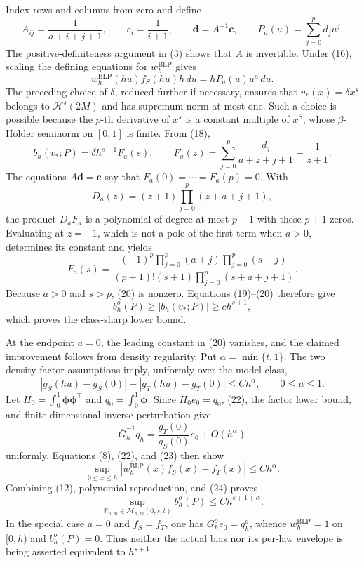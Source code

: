 Index rows and columns from zero and define
\[
A_{ij}=\frac1{a+i+j+1},
\qquad c_i=\frac1{i+1},
\qquad \boldsymbol d=A^{-1}\boldsymbol c,
\qquad P_a(u)=\sum_{j=0}^pd_ju^j.
\tag{17}
\]
The positive-definiteness argument in (3) shows that \(A\) is invertible. Under (16), scaling the defining equations for \(w_h^{\mathrm{BLP}}\) gives
\[
w_h^{\mathrm{BLP}}(hu)f_S(hu)h\,du
=hP_a(u)u^a\,du.
\tag{18}
\]
The preceding choice of \(\delta\), reduced further if necessary, ensures that \(v_*(x)=\delta x^s\) belongs to \(\mathcal H^s(2M)\) and has supremum norm at most one. Such a choice is possible because the \(p\)-th derivative of \(x^s\) is a constant multiple of \(x^\beta\), whose \(\beta\)-Hölder seminorm on \([0,1]\) is finite. From (18),
\[
b_h(v_*;P)=\delta h^{s+1}F_a(s),
\qquad
F_a(z)=\sum_{j=0}^p\frac{d_j}{a+z+j+1}-\frac1{z+1}.
\tag{19}
\]
The equations \(A\boldsymbol d=\boldsymbol c\) say that \(F_a(0)=\cdots=F_a(p)=0\). With
\[
D_a(z)=(z+1)\prod_{j=0}^p(z+a+j+1),
\]
the product \(D_aF_a\) is a polynomial of degree at most \(p+1\) with these \(p+1\) zeros. Evaluating at \(z=-1\), which is not a pole of the first term when \(a>0\), determines its constant and yields
\[
F_a(s)=
\frac{(-1)^p
\displaystyle\prod_{j=0}^p(a+j)
\displaystyle\prod_{j=0}^p(s-j)}
{(p+1)!(s+1)
\displaystyle\prod_{j=0}^p(s+a+j+1)}.
\tag{20}
\]
Because \(a>0\) and \(s>p\), (20) is nonzero. Equations (19)--(20) therefore give
\[
b_h^o(P)\ge |b_h(v_*;P)|\ge c h^{s+1},
\tag{21}
\]
which proves the class-sharp lower bound.

At the endpoint \(a=0\), the leading constant in (20) vanishes, and the claimed improvement follows from density regularity. Put \(\alpha=\min\{t,1\}\). The two density-factor assumptions imply, uniformly over the model class,
\[
|g_S(hu)-g_S(0)|+|g_T(hu)-g_T(0)|\le Ch^\alpha,
\qquad 0\le u\le1.
\tag{22}
\]
Let \(H_0=\int_0^1\boldsymbol\phi\boldsymbol\phi^\top\) and \(q_0=\int_0^1\boldsymbol\phi\). Since \(H_0e_0=q_0\), (22), the factor lower bound, and finite-dimensional inverse perturbation give
\[
\overline G_h^{-1}\overline q_h
=\frac{g_T(0)}{g_S(0)}e_0+O(h^\alpha)
\tag{23}
\]
uniformly. Equations (8), (22), and (23) then show
\[
\sup_{0\le x\le h}
|w_h^{\mathrm{BLP}}(x)f_S(x)-f_T(x)|\le Ch^\alpha.
\tag{24}
\]
Combining (12), polynomial reproduction, and (24) proves
\[
\sup_{\mathbb P_{n,m}\in\mathcal M_{n,m}(0,s,t)}b_h^o(P)
\le Ch^{s+1+\alpha}.
\tag{25}
\]
In the special case \(a=0\) and \(f_S=f_T\), one has \(G_h^oe_0=q_h^o\), whence \(w_h^{\mathrm{BLP}}=1\) on \([0,h)\) and \(b_h^o(P)=0\). Thus neither the actual bias nor its per-law envelope is being asserted equivalent to \(h^{s+1}\).


